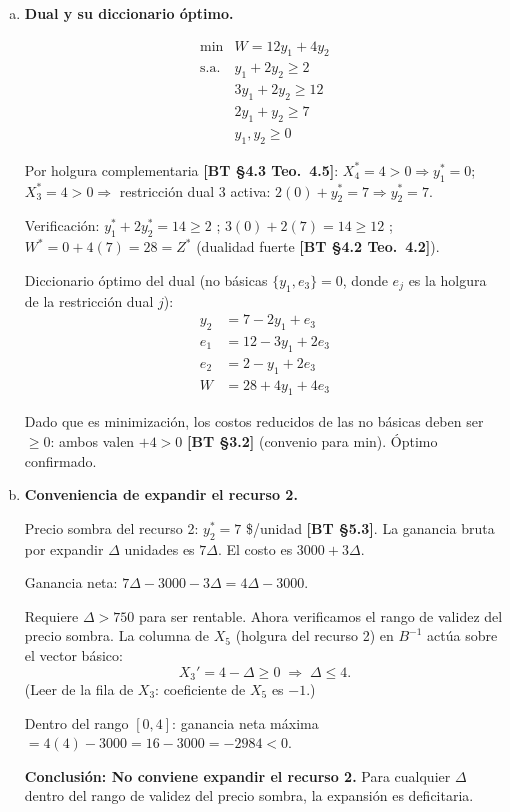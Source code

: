 \documentclass{article}
\begin{document}
\begin{enumerate}[a)]
\textit{Verificación:} $(X_1^*, X_2^*, X_3^*) = (0,0,4)$: recurso 1: $2(4)=8\leq 12$ \checkmark; recurso 2: $4 \leq 4$ \checkmark; $Z=28$ \checkmark.

\item \textbf{Dual y su diccionario óptimo.}

\[
\begin{array}{ll}
\min & W = 12y_1 + 4y_2 \\
\text{s.a.} & y_1 + 2y_2 \geq 2 \\
& 3y_1 + 2y_2 \geq 12 \\
& 2y_1 + y_2 \geq 7 \\
& y_1, y_2 \geq 0
\end{array}
\]

Por holgura complementaria \textbf{[BT §4.3 Teo.\ 4.5]}: $X_4^* = 4 > 0 \Rightarrow y_1^* = 0$; $X_3^* = 4 > 0 \Rightarrow$ restricción dual 3 activa: $2(0) + y_2^* = 7 \Rightarrow y_2^* = 7$.

Verificación: $y_1^* + 2y_2^* = 14 \geq 2$ \checkmark; $3(0)+2(7)=14\geq 12$ \checkmark; $W^* = 0+4(7) = 28 = Z^*$ \checkmark (dualidad fuerte \textbf{[BT §4.2 Teo.\ 4.2]}).

\medskip
Diccionario óptimo del dual (no básicas $\{y_1, e_3\} = 0$, donde $e_j$ es la holgura de la restricción dual $j$):
\begin{align*}
y_2    &= 7 - 2y_1 + e_3 \\
e_1    &= 12 - 3y_1 + 2e_3 \\
e_2    &= 2 - y_1 + 2e_3 \\
W      &= 28 + 4y_1 + 4e_3
\end{align*}

Dado que es minimización, los costos reducidos de las no básicas deben ser $\geq 0$: ambos valen $+4 > 0$ \textbf{[BT §3.2]} (convenio para min). Óptimo confirmado.

\item \textbf{Conveniencia de expandir el recurso 2.}

Precio sombra del recurso 2: $y_2^* = 7$ \$/unidad \textbf{[BT §5.3]}. La ganancia bruta por expandir $\Delta$ unidades es $7\Delta$. El costo es $3000 + 3\Delta$.

Ganancia neta: $7\Delta - 3000 - 3\Delta = 4\Delta - 3000$.

Requiere $\Delta > 750$ para ser rentable. Ahora verificamos el rango de validez del precio sombra. La columna de $X_5$ (holgura del recurso 2) en $B^{-1}$ actúa sobre el vector básico:
\[
  X_3' = 4 - \Delta \geq 0 \;\Rightarrow\; \Delta \leq 4.
\]
(Leer de la fila de $X_3$: coeficiente de $X_5$ es $-1$.)

Dentro del rango $[0,4]$: ganancia neta máxima $= 4(4) - 3000 = 16 - 3000 = -2984 < 0$.

\textbf{Conclusión: No conviene expandir el recurso 2.} Para cualquier $\Delta$ dentro del rango de validez del precio sombra, la expansión es deficitaria.

\end{enumerate}
\end{document}
